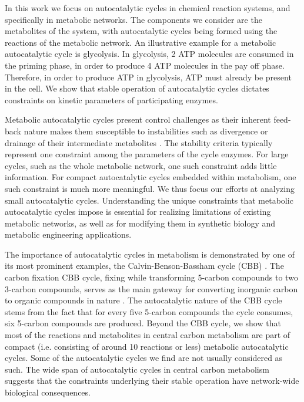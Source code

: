     In this work we focus on autocatalytic cycles in chemical reaction systems, and specifically in metabolic networks.
    The components we consider are the metabolites of the system, with autocatalytic cycles being formed using the reactions of the metabolic network.
    An illustrative example for a metabolic autocatalytic cycle is glycolysis.
    In glycolysis, 2 ATP molecules are consumed in the priming phase, in order to produce 4 ATP molecules in the pay off phase.
    Therefore, in order to produce ATP in glycolysis, ATP must already be present in the cell.
    We show that stable operation of autocatalytic cycles dictates constraints on kinetic parameters of participating enzymes.

    Metabolic autocatalytic cycles present control challenges as their inherent feed-back nature makes them susceptible to instabilities such as divergence or drainage of their intermediate metabolites \cite{Fell1999,Reznik2010-te,Teusink1998-he}.
    The stability criteria typically represent one constraint among the parameters of the cycle enzymes.
    For large cycles, such as the whole metabolic network, one such constraint adds little information.
    For compact autocatalytic cycles embedded within metabolism, one such constraint is much more meaningful.
    We thus focus our efforts at analyzing small autocatalytic cycles.
    Understanding the unique constraints that metabolic autocatalytic cycles impose is essential for realizing limitations of existing metabolic networks, as well as for modifying them in synthetic biology and metabolic engineering applications.

    The importance of autocatalytic cycles in metabolism is demonstrated by one of its most prominent examples, the Calvin-Benson-Bassham cycle (CBB) \cite{Benson1950-cl}.
    The carbon fixation CBB cycle, fixing  while transforming 5-carbon compounds to two 3-carbon compounds, serves as the main gateway for converting inorganic carbon to organic compounds in nature \cite{Raven2012-le}.
    The autocatalytic nature of the CBB cycle stems from the fact that for every five 5-carbon compounds the cycle consumes, six 5-carbon compounds are produced.
    Beyond the CBB cycle, we show that most of the reactions and metabolites in central carbon metabolism are part of compact (i.e. consisting of around 10 reactions or less) metabolic autocatalytic cycles.
    Some of the autocatalytic cycles we find are not usually considered as such.
    The wide span of autocatalytic cycles in central carbon metabolism suggests that the constraints underlying their stable operation have network-wide biological consequences.

